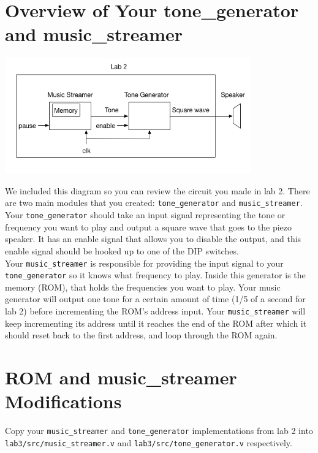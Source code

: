 \documentclass[11pt]{article}
\begin{document}
\section{Overview of Your tone\_generator and music\_streamer}

\begin{center}
\includegraphics[height=5cm]{images/lab2_fig1.png}
\end{center}

We included this diagram so you can review the circuit you made in lab 2. There are two main modules that you created: \verb|tone_generator| and \verb|music_streamer|. \\

Your \verb|tone_generator| should take an input signal representing the tone or frequency you want to play and output a square wave that goes to the piezo speaker. It has an enable signal that allows you to disable the output, and this enable signal should be hooked up to one of the DIP switches.  \\

Your \verb|music_streamer| is responsible for providing the input signal to your \verb|tone_generator| so it knows what frequency to play. Inside this generator is the memory (ROM), that holds the frequencies you want to play. Your music generator will output one tone for a certain amount of time (1/5 of a second for lab 2) before incrementing the ROM's address input. Your \verb|music_streamer| will keep incrementing its address until it reaches the end of the ROM after which it should reset back to the first address, and loop through the ROM again.

\section{ROM and music\_streamer Modifications}
Copy your \verb|music_streamer| and \verb|tone_generator| implementations from lab 2 into \verb|lab3/src/music_streamer.v| and \verb|lab3/src/tone_generator.v| respectively. 
\end{document}
